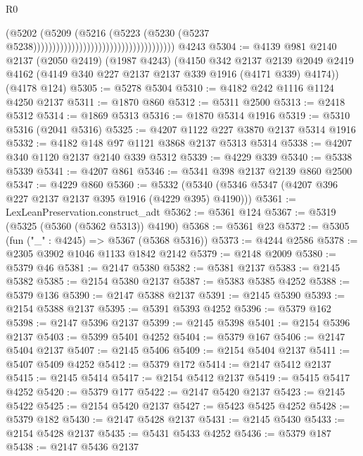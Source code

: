 \begin{lexlean}{R0}
\begin{coremodule}
                                                                  (@5202
                                                                    (@5209
                                                                      (@5216
                                                                        (@5223
                                                                          (@5230
                                                                            (@5237
                                                                              @5238)))))))))))))))))))))))))))))))))))))
    @4243
@5304 := @4139
    @981
    @2140
    @2137
    (@2050 @2419)
    (@1987 @4243)
    (@4150
      @342
      @2137
      @2139
      @2049
      @2419
      @4162
      (@4149 @340 @227 @2137 @2137 @339 @1916 (@4171 @339) @4174))
    (@4178 @124)
@5305 := @5278 @5304
@5310 := @4182 @242 @1116 @1124 @4250 @2137
@5311 := @1870 @860
@5312 := @5311 @2500
@5313 := @2418 @5312
@5314 := @1869 @5313
@5316 := @1870 @5314 @1916
@5319 := @5310 @5316 (@2041 @5316)
@5325 := @4207 @1122 @227 @3870 @2137 @5314 @1916
@5332 := @4182 @148 @97 @1121 @3868 @2137 @5313 @5314
@5338 := @4207 @340 @1120 @2137 @2140 @339 @5312
@5339 := @4229 @339
@5340 := @5338 @5339
@5341 := @4207 @861
@5346 := @5341 @398 @2137 @2139 @860 @2500
@5347 := @4229 @860
@5360 := @5332 (@5340 (@5346 @5347 (@4207 @396 @227 @2137 @2137 @395 @1916 (@4229 @395) @4190)))
@5361 := LexLeanPreservation.construct_adt
@5362 := @5361 @124
@5367 := @5319 (@5325 (@5360 (@5362 @5313)) @4190)
@5368 := @5361 @23
@5372 := @5305 (fun ("_" : @4245) => @5367 (@5368 @5316))
@5373 := @4244 @2586
@5378 := @2305 @3902 @1046 @1133 @1842 @2142
@5379 := @2148 @2009
@5380 := @5379 @46
@5381 := @2147 @5380
@5382 := @5381 @2137
@5383 := @2145 @5382
@5385 := @2154 @5380 @2137
@5387 := @5383 @5385 @4252
@5388 := @5379 @136
@5390 := @2147 @5388 @2137
@5391 := @2145 @5390
@5393 := @2154 @5388 @2137
@5395 := @5391 @5393 @4252
@5396 := @5379 @162
@5398 := @2147 @5396 @2137
@5399 := @2145 @5398
@5401 := @2154 @5396 @2137
@5403 := @5399 @5401 @4252
@5404 := @5379 @167
@5406 := @2147 @5404 @2137
@5407 := @2145 @5406
@5409 := @2154 @5404 @2137
@5411 := @5407 @5409 @4252
@5412 := @5379 @172
@5414 := @2147 @5412 @2137
@5415 := @2145 @5414
@5417 := @2154 @5412 @2137
@5419 := @5415 @5417 @4252
@5420 := @5379 @177
@5422 := @2147 @5420 @2137
@5423 := @2145 @5422
@5425 := @2154 @5420 @2137
@5427 := @5423 @5425 @4252
@5428 := @5379 @182
@5430 := @2147 @5428 @2137
@5431 := @2145 @5430
@5433 := @2154 @5428 @2137
@5435 := @5431 @5433 @4252
@5436 := @5379 @187
@5438 := @2147 @5436 @2137

\end{coremodule}
\end{lexlean}
